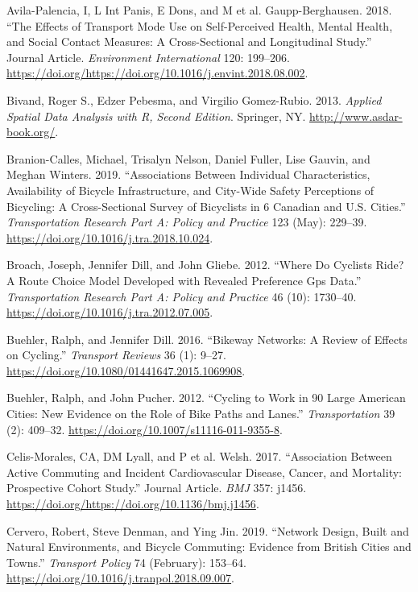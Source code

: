 \documentclass[smallextended]{svjour3}       %
\begin{document}
\leavevmode\hypertarget{ref-Avila2018}{}%
Avila-Palencia, I, L Int Panis, E Dons, and M et al. Gaupp-Berghausen.
2018. ``The Effects of Transport Mode Use on Self-Perceived Health,
Mental Health, and Social Contact Measures: A Cross-Sectional and
Longitudinal Study.'' Journal Article. \emph{Environment International}
120: 199--206.
\url{https://doi.org/https://doi.org/10.1016/j.envint.2018.08.002}.

\leavevmode\hypertarget{ref-Bivand2013}{}%
Bivand, Roger S., Edzer Pebesma, and Virgilio Gomez-Rubio. 2013.
\emph{Applied Spatial Data Analysis with R, Second Edition}. Springer,
NY. \url{http://www.asdar-book.org/}.

\leavevmode\hypertarget{ref-Branion2019}{}%
Branion-Calles, Michael, Trisalyn Nelson, Daniel Fuller, Lise Gauvin,
and Meghan Winters. 2019. ``Associations Between Individual
Characteristics, Availability of Bicycle Infrastructure, and City-Wide
Safety Perceptions of Bicycling: A Cross-Sectional Survey of Bicyclists
in 6 Canadian and U.S. Cities.'' \emph{Transportation Research Part A:
Policy and Practice} 123 (May): 229--39.
\url{https://doi.org/10.1016/j.tra.2018.10.024}.

\leavevmode\hypertarget{ref-Broach2012}{}%
Broach, Joseph, Jennifer Dill, and John Gliebe. 2012. ``Where Do
Cyclists Ride? A Route Choice Model Developed with Revealed Preference
Gps Data.'' \emph{Transportation Research Part A: Policy and Practice}
46 (10): 1730--40. \url{https://doi.org/10.1016/j.tra.2012.07.005}.

\leavevmode\hypertarget{ref-Buehler2016}{}%
Buehler, Ralph, and Jennifer Dill. 2016. ``Bikeway Networks: A Review of
Effects on Cycling.'' \emph{Transport Reviews} 36 (1): 9--27.
\url{https://doi.org/10.1080/01441647.2015.1069908}.

\leavevmode\hypertarget{ref-Buehler2012}{}%
Buehler, Ralph, and John Pucher. 2012. ``Cycling to Work in 90 Large
American Cities: New Evidence on the Role of Bike Paths and Lanes.''
\emph{Transportation} 39 (2): 409--32.
\url{https://doi.org/10.1007/s11116-011-9355-8}.

\leavevmode\hypertarget{ref-Celis2017}{}%
Celis-Morales, CA, DM Lyall, and P et al. Welsh. 2017. ``Association
Between Active Commuting and Incident Cardiovascular Disease, Cancer,
and Mortality: Prospective Cohort Study.'' Journal Article. \emph{BMJ}
357: j1456. \url{https://doi.org/https://doi.org/10.1136/bmj.j1456}.

\leavevmode\hypertarget{ref-Cervero2019}{}%
Cervero, Robert, Steve Denman, and Ying Jin. 2019. ``Network Design,
Built and Natural Environments, and Bicycle Commuting: Evidence from
British Cities and Towns.'' \emph{Transport Policy} 74 (February):
153--64. \url{https://doi.org/10.1016/j.tranpol.2018.09.007}.
\end{document}

